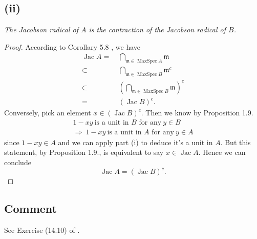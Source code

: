 \subsection{(ii)}\textit{The Jacobson radical of $A$ is the contraction of the Jacobson radical of $B$.}
\begin{proof}
	According to Corollary 5.8 \cite{atiyah1994introduction}, we have 
	\begin{align*}
		\operatorname{Jac}A=&~ \bigcap_{\mathfrak m\in\operatorname{MaxSpec}A}\mathfrak m\\
		\subset&~ \bigcap_{\mathfrak m\in\operatorname{MaxSpec}B}\mathfrak m^c\\
		\subset&~ (\bigcap_{\mathfrak m\in\operatorname{MaxSpec}B}\mathfrak m)^c\\
		=&~ (\operatorname{Jac}B)^c.
	\end{align*}
	Conversely, pick an element $x\in (\operatorname{Jac}B)^c$. Then we know by Proposition 1.9. \cite{atiyah1994introduction}
	\begin{align*}
		1-xy ~\text{is a unit in $B$ for any}~ y\in B\\
		\Rightarrow~ 1-xy ~\text{is a unit in $A$ for any}~ y\in A
	\end{align*}since $1-xy\in A$ and we can apply part (i) to deduce it's a unit in $A$. But this statement, by Proposition 1.9., is equivalent to say $x\in\operatorname{Jac}A$. Hence we can conclude \[\operatorname{Jac}A=(\operatorname{Jac}B)^c.\]
\end{proof}
\subsection{Comment}

See Exercise (14.10) of \cite{altman}.